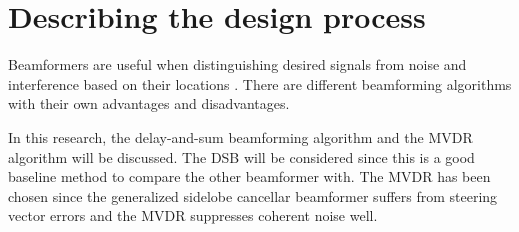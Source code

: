 \chapter{Describing the design process}
\label{chap:design}

Beamformers are useful when distinguishing desired signals from noise and interference based on their locations \cite{himawan2011}. There are different beamforming algorithms with their own advantages and disadvantages. 

In this research, the delay-and-sum beamforming algorithm \cite{elko1996} and the MVDR algorithm \cite{habetsspeech2010} will be discussed. The DSB will be considered since this is a good baseline method to compare the other beamformer with. The MVDR has been chosen since the generalized sidelobe cancellar beamformer suffers from steering vector errors and the MVDR suppresses coherent noise well.






